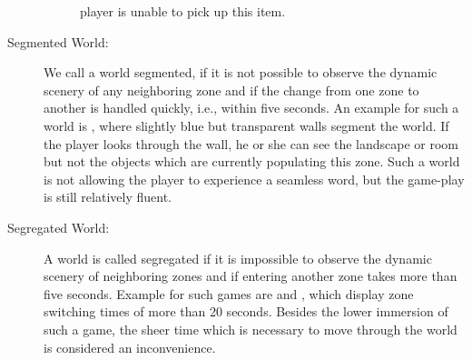 \documentclass[a4paper, 10pt]{book}
\begin{document}
\begin{description}
\begin{description}
                            player is unable to pick up this item.
                    \end{description}
                \item[Segmented World:] We call a world segmented, if it is not
                    possible to observe the dynamic scenery of any neighboring zone and
                    if the change from one zone to another is handled quickly, i.e.,
                    within five seconds.
                    An example for such a world is \DARKAGE, where slightly blue but
                    transparent walls segment the world. If the player looks through the
                    wall, he or she can see the landscape or room but not the
                    objects which are currently populating this zone.
                    Such a world is not allowing the player to experience a seamless
                    word, but the game-play is still relatively fluent. 
                \item[Segregated World:] A world is called segregated if it is
                    impossible to observe the dynamic scenery of neighboring zones and
                    if entering another zone takes more than five seconds.
                    Example for such games are \ASHERON and \ANARCHY, which
                    display zone switching times of more than 20 seconds. Besides the
                    lower immersion of such a game, the sheer time which is necessary to
                    move through the world is considered an inconvenience. 
            \end{description}
\end{document}
